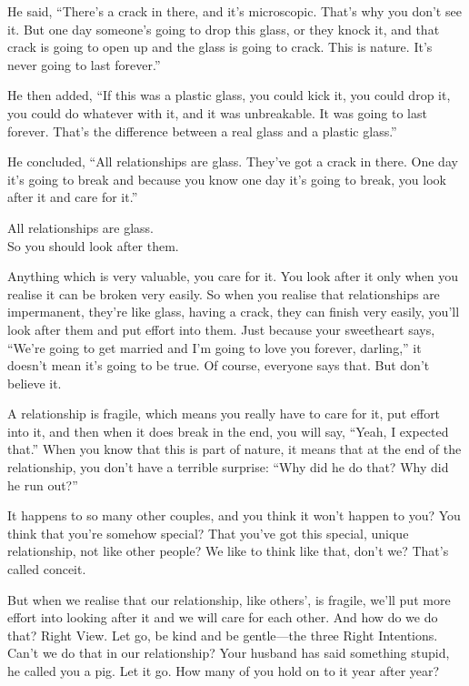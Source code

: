 \documentclass[12pt, openany]{book}
\newenvironment{aphorism}%
{%
\begin{center}\begin{itshape}
}%
{\end{itshape}\end{center}
}%
\begin{document}
He said, “There’s a crack in there, and it’s microscopic. That’s why you don’t see it. But one day someone’s going to drop this glass, or they knock it, and that crack is going to open up and the glass is going to crack. This is nature. It’s never going to last forever.” 

He then added, “If this was a plastic glass, you could kick it, you could drop it, you could do whatever with it, and it was unbreakable. It was going to last forever. That’s the difference between a real glass and a plastic glass.” 

He concluded, “All relationships are glass. They’ve got a crack in there. One day it’s going to break and because you know one day it’s going to break, you look after it and care for it.” 

\newpage

\begin{aphorism}
All relationships are glass.\\  
So you should look after them.
\end{aphorism}

Anything which is very valuable, you care for it. You look after it only when you realise it can be broken very easily. So when you realise that relationships are impermanent, they’re like glass, having a crack, they can finish very easily, you’ll look after them and put effort into them. Just because your sweetheart says, “We’re going to get married and I’m going to love you forever, darling,” it doesn’t mean it’s going to be true. Of course, everyone says that. But don’t believe it. 

A relationship is fragile, which means you really have to care for it, put effort into it, and then when it does break in the end, you will say, “Yeah, I expected that.” When you know that this is part of nature, it means that at the end of the relationship, you don’t have a terrible surprise: “Why did he do that? Why did he run out?” 

It happens to so many other couples, and you think it won’t happen to you? You think that you’re somehow special? That you’ve got this special, unique relationship, not like other people? We like to think like that, don’t we? That’s called conceit. 

But when we realise that our relationship, like others’, is fragile, we’ll put more effort into looking after it and we will care for each other. And how do we do that? Right View. Let go, be kind and be gentle—the three Right Intentions. Can’t we do that in our relationship? Your husband has said something stupid, he called you a pig. Let it go. How many of you hold on to it year after year? 
\end{document}
